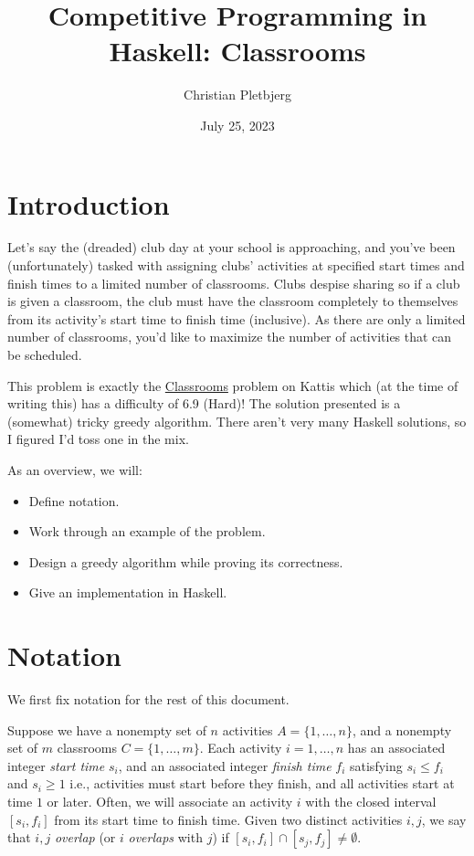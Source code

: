 \documentclass{article}
\title{Competitive Programming in Haskell: Classrooms}
\author{Christian Pletbjerg}
\date{July 25, 2023}
\theoremstyle{plain}%
\theoremstyle{definition}
\theoremstyle{remark}
\begin{document}
\maketitle

\tableofcontents

\section{Introduction}
Let's say the (dreaded) club day at your school is approaching, and you've been
    (unfortunately) tasked with assigning clubs' activities at specified start
    times and finish times to a limited number of classrooms.
Clubs despise sharing so if a club is given a classroom, the club must have the
    classroom completely to themselves from its activity's start time to finish
    time (inclusive).
As there are only a limited number of classrooms, you'd like to maximize
    the number of activities that can be scheduled.

This problem is exactly the
    \href{https://open.kattis.com/problems/classrooms}{Classrooms} problem on
    Kattis which (at the time of writing this) has a difficulty of 6.9 (Hard)!
The solution presented is a (somewhat) tricky greedy algorithm.
There aren't very many Haskell solutions, so I figured I'd toss one in
    the mix.

As an overview, we will:
\begin{itemize}
    \item Define notation.
    \item Work through an example of the problem.
    \item Design a greedy algorithm while proving its correctness.
    \item Give an implementation in Haskell.
\end{itemize}

\section{Notation}
We first fix notation for the rest of this document.

Suppose we have a nonempty set of $n$ activities $A = \{1,\dots,n\}$, 
    and a nonempty set of $m$ classrooms $C = \{1,\dots,m\}$.
Each activity $i = 1,\dots, n$ has an associated integer \emph{start time} $s_i$, and
    an associated integer \emph{finish time} $f_i$ satisfying $s_i \le f_i$ and $s_i \ge 1$ 
    i.e., activities must start before they finish, and all activities start
    at time $1$ or later.
Often, we will associate an activity $i$ with the closed interval $[s_i,f_i]$
    from its start time to finish time.
Given two distinct activities $i,j$, we say that $i,j$ \emph{overlap} (or $i$
    \emph{overlaps} with $j$) if $[s_i, f_i] \cap [s_j,f_j] \neq \emptyset$.
\end{document}
